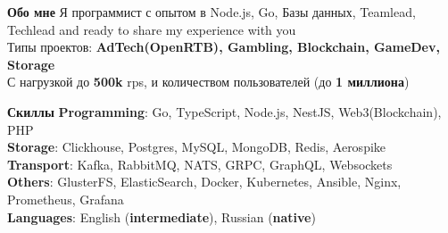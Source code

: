 \documentclass{resume}
\begin{document}

\begin{rSection}{\textbf{Обо мне}}
{
    Я программист с опытом в Node.js, Go, Базы данных, Teamlead, Techlead and ready to share my experience with you
\\  Типы проектов: \textbf{AdTech(OpenRTB), Gambling, Blockchain, GameDev, Storage}
\\  С нагрузкой до \textbf{500k} rps, и количеством пользователей (до \textbf{1 миллиона})
}

\end{rSection}
\begin{rSection}{\textbf{Скиллы}}
    \textbf{Programming}: Go, TypeScript, Node.js, NestJS, Web3(Blockchain), PHP
    \\ \textbf{Storage}: Clickhouse, Postgres, MySQL, MongoDB, Redis, Aerospike
    \\ \textbf{Transport}: Kafka, RabbitMQ, NATS, GRPC, GraphQL, Websockets
    \\ \textbf{Others}: GlusterFS, ElasticSearch, Docker, Kubernetes, Ansible, Nginx, Prometheus, Grafana
    \\ \textbf{Languages}: English ({\textbf{intermediate}}), Russian ({\textbf{native}})
\end{rSection}
\end{document}

